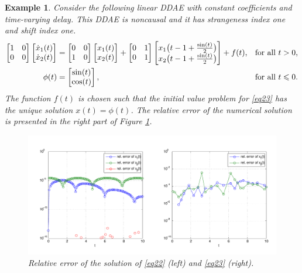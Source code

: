 \documentclass[final,reqno]{siamltex}
\renewenvironment{enumerate}[1]{\begin{compactenum}#1}{\end{compactenum}}
\newtheorem{example}[theorem]{Example}
\begin{document}
\begin{example} {\rm Consider the following linear DDAE with constant coefficients and time-varying delay. This DDAE
is noncausal and it has strangeness index one and shift index one.
%
\begin{equation}\label{eq23}
\begin{aligned}
\m{
1&0\\
0&0 \\
}
\m{\dot{x}_1(t) \\ \dot{x}_2(t)} &=
\m{
0&0\\
1&0 \\
}
\m{x_1(t) \\ x_2(t)} +
\m{
0&1\\
0&1
}
\m{x_1\bigl(t-1+\frac{\sin(t)}2\bigr) \\ x_2\bigl(t-1+\frac{\sin(t)}2\bigr)}
+f(t), && \mbox{for all } t>0,\\
\phi(t) &=
\m{
\sin(t)\\
\cos(t)
},
&& \mbox{for all } t \leq 0.
\end{aligned}
\end{equation}
%
The function $f(t)$ is chosen such that the initial value problem for  \eqref{eq23} has the unique solution $x(t)=\phi(t)$.
The relative error of the numerical solution  is presented in the right part of Figure \ref{fig_222}.
%
\begin{figure}[h!]
 \centering
 \includegraphics[width=\textwidth]{plot_222_varshifted.pdf}
 \caption{Relative error of the solution of \eqref{eq22} (left) and \eqref{eq23} (right).}
 \label{fig_222}
\end{figure}
}
\end{example}
%
\end{document}
